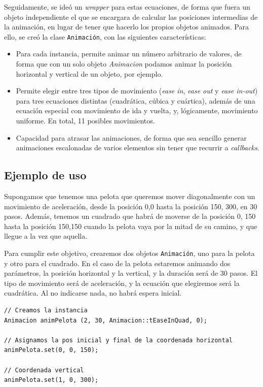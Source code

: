 Seguidamente, se ideó un \textit{wrapper} para estas ecuaciones, de forma que
fuera un objeto independiente el que se encargara de calcular las posiciones
intermedias de la animación, en lugar de tener que hacerlo los propios objetos
animados. Para ello, se creó la clase \texttt{Animación}, con las siguientes
características:
\begin{itemize}
\item Para cada instancia, permite animar un número arbitrario de valores, de
  forma que con un solo objeto \textit{Animacion} podamos animar la posición
  horizontal y vertical de un objeto, por ejemplo.
\item Permite elegir entre tres tipos de movimiento (\textit{ease in},
  \textit{ease out} y \textit{ease in-out}) para tres ecuaciones distintas
  (cuadrática, cúbica y cuártica), además de una ecuación especial con
  movimiento de ida y vuelta, y, lógicamente, movimiento uniforme. En total, 11
  posibles movimientos.
\item Capacidad para atrasar las animaciones, de forma que sea sencillo generar
  animaciones escalonadas de varios elementos sin tener que recurrir a
  \textit{callbacks}.
\end{itemize}

\subsection{Ejemplo de uso}

Supongamos que tenemos una pelota que queremos mover diagonalmente con un
movimiento de aceleración, desde la posición 0,0 hasta la posición 150, 300, en
30 pasos. Además, tenemos un cuadrado que habrá de moverse de la posición 0, 150
hasta la posición 150,150 cuando la pelota vaya por la mitad de su camino, y que
llegue a la vez que aquella.

Para cumplir este objetivo, crearemos dos objetos \texttt{Animación}, uno para
la pelota y otro para el cuadrado. En el caso de la pelota estaremos animando
dos parámetros, la posición horizontal y la vertical, y la duración será de 30
pasos. El tipo de movimiento será de aceleración, y la ecuación que elegiremos
será la cuadrática. Al no indicarse nada, no habrá espera inicial.

\begin{verbatim}
// Creamos la instancia
Animacion animPelota (2, 30, Animacion::tEaseInQuad, 0);

// Asignamos la pos inicial y final de la coordenada horizontal
animPelota.set(0, 0, 150);  

// Coordenada vertical
animPelota.set(1, 0, 300);
\end{verbatim}

